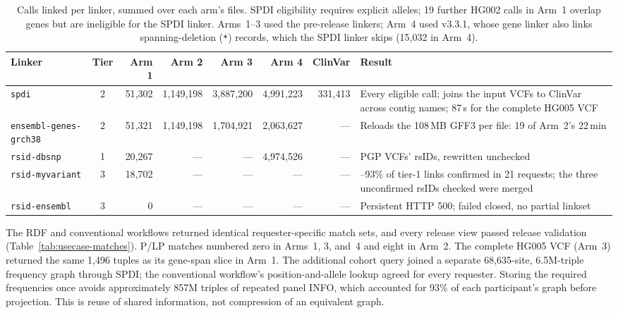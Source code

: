 \documentclass[11pt]{article}
\newcommand{\rowsep}{\noalign{\vskip2pt{\color{black!22}\hrule height 0.4pt}\vskip2pt}}%
\begin{document}
\begin{table}[!htbp]
\caption{Calls linked per linker, summed over each arm's files. SPDI eligibility requires explicit alleles; 19 further HG002 calls in Arm~1 overlap genes but are ineligible for the SPDI linker. Arms~1--3 used the pre-release linkers; Arm~4 used v3.3.1, whose gene linker also links spanning-deletion (\texttt{*}) records, which the SPDI linker skips (15,032 in Arm~4).}\label{tab:usecase-links}%
\centering\footnotesize\setlength{\tabcolsep}{4pt}\renewcommand{\arraystretch}{1.1}\renewcommand{\tabularxcolumn}[1]{m{#1}}%
\setlength{\tabcolsep}{3.5pt}%
\begin{tabularx}{\textwidth}{@{}l c r r r r r >{\raggedright\arraybackslash}X@{}}
\toprule
\textbf{Linker} & \textbf{Tier} & \textbf{Arm 1} & \textbf{Arm 2} & \textbf{Arm 3} & \textbf{Arm 4} & \textbf{ClinVar} & \textbf{Result}\\
\midrule
\texttt{spdi} & 2 & 51{,}302 & 1{,}149{,}198 & 3{,}887{,}200 & 4{,}991{,}223 & 331{,}413 & Every eligible call; joins the input VCFs to ClinVar across contig names; 87\,s for the complete HG005 VCF\\
\rowsep
\texttt{ensembl-genes-grch38} & 2 & 51{,}321 & 1{,}149{,}198 & 1{,}704{,}921 & 2{,}063{,}627 & --- & Reloads the 108\,MB GFF3 per file: 19 of Arm~2's 22\,min\\
\rowsep
\texttt{rsid-dbsnp} & 1 & 20{,}267 & --- & --- & 4{,}974{,}526 & --- & PGP VCFs' rsIDs, rewritten unchecked\\
\rowsep
\texttt{rsid-myvariant} & 3 & 18{,}702 & --- & --- & --- & --- & 92--93\% of tier-1 links confirmed in 21 requests; the three unconfirmed rsIDs checked were merged\\
\rowsep
\texttt{rsid-ensembl} & 3 & 0 & --- & --- & --- & --- & Persistent HTTP 500; failed closed, no partial linkset\\
\bottomrule
\end{tabularx}
\end{table}

The RDF and conventional workflows returned identical requester-specific match sets, and every release view passed release validation (Table~\ref{tab:usecase-matches}).
P/LP matches numbered zero in Arms~1, 3, and~4 and eight in Arm~2.
The complete HG005 VCF (Arm~3) returned the same 1,496 tuples as its gene-span slice in Arm~1.
The additional cohort query joined a separate 68,635-site, 6.5M-triple frequency graph through SPDI; the conventional workflow's position-and-allele lookup agreed for every requester.
Storing the required frequencies once avoids approximately 857M triples of repeated panel INFO, which accounted for 93\% of each participant's graph before projection.
This is reuse of shared information, not compression of an equivalent graph.
\end{document}
